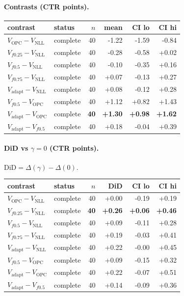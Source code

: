 \documentclass[10pt,a4paper]{article}
\begin{document}
\paragraph{Contrasts (CTR points).}
{\centering\small\begin{tabular}{llrrrr}
\toprule contrast & status & $n$ & mean & CI lo & CI hi \\
\midrule
$V_{\mathrm{OPC}}-V_{\mathrm{NLL}}$ & complete & 40 & -1.22 & -1.59 & -0.84 \\
$V_{f0.25}-V_{\mathrm{NLL}}$ & complete & 40 & -0.28 & -0.58 & +0.02 \\
$V_{f0.5}-V_{\mathrm{NLL}}$ & complete & 40 & -0.10 & -0.35 & +0.16 \\
$V_{f0.75}-V_{\mathrm{NLL}}$ & complete & 40 & +0.07 & -0.13 & +0.27 \\
$V_{\mathrm{adapt}}-V_{\mathrm{NLL}}$ & complete & 40 & +0.08 & -0.12 & +0.28 \\
$V_{f0.5}-V_{\mathrm{OPC}}$ & complete & 40 & +1.12 & +0.82 & +1.43 \\
\textbf{$V_{\mathrm{adapt}}-V_{\mathrm{OPC}}$} & complete & \textbf{40} & \textbf{+1.30} & \textbf{+0.98} & \textbf{+1.62} \\
$V_{\mathrm{adapt}}-V_{f0.5}$ & complete & 40 & +0.18 & -0.04 & +0.39 \\
\bottomrule\end{tabular}\par}
\paragraph{DiD vs $\gamma=0$ (CTR points).} $\mathrm{DiD}=\Delta(\gamma)-\Delta(0)$.
{\centering\small\begin{tabular}{llrrrr}
\toprule contrast & status & $n$ & DiD & CI lo & CI hi \\
\midrule
$V_{\mathrm{OPC}}-V_{\mathrm{NLL}}$ & complete & 40 & +0.00 & -0.19 & +0.19 \\
\textbf{$V_{f0.25}-V_{\mathrm{NLL}}$} & complete & \textbf{40} & \textbf{+0.26} & \textbf{+0.06} & \textbf{+0.46} \\
$V_{f0.5}-V_{\mathrm{NLL}}$ & complete & 40 & +0.09 & -0.11 & +0.28 \\
$V_{f0.75}-V_{\mathrm{NLL}}$ & complete & 40 & +0.19 & -0.03 & +0.41 \\
$V_{\mathrm{adapt}}-V_{\mathrm{NLL}}$ & complete & 40 & +0.22 & -0.00 & +0.45 \\
$V_{f0.5}-V_{\mathrm{OPC}}$ & complete & 40 & +0.09 & -0.15 & +0.32 \\
$V_{\mathrm{adapt}}-V_{\mathrm{OPC}}$ & complete & 40 & +0.22 & -0.07 & +0.51 \\
$V_{\mathrm{adapt}}-V_{f0.5}$ & complete & 40 & +0.14 & -0.09 & +0.36 \\
\bottomrule\end{tabular}\par}
\bigskip
\end{document}
